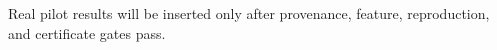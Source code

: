 Real pilot results will be inserted only after provenance, feature, reproduction, and certificate gates pass.

